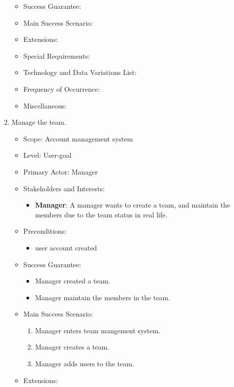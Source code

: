 \documentclass[12pt, a4paper]{article}
\begin{document}
\begin{CJK*}{UTF8}{bkai}
\begin{enumerate}
\begin{itemize}
          \item Success Guarantee:
          \item Main Success Scenario:
          \item Extensions:
          \item Special Requirements:
          \item Technology and Data Variations List:
          \item Frequency of Occurrence:
          \item Miscellaneous:
        \end{itemize}
      \item Manage the team.
        \begin{itemize}
          \item Scope: Account management system
          \item Level: User-goal
          \item Primary Actor: Manager
          \item Stakeholders and Interests:
            \begin{itemize}
              \item {\bf Manager}: A manager wants to create a team, and maintain the members due to the team status in real life.
            \end{itemize}
          \item Preconditions:
            \begin{itemize}
              \item user account created
            \end{itemize}
          \item Success Guarantee:
            \begin{itemize}
              \item Manager created a team.
              \item Manager maintain the members in the team.
            \end{itemize}
          \item Main Success Scenario:
            \begin{enumerate}
              \item Manager enters team mangement system.
              \item Manager creates a team.
              \item Manager adds users to the team.
            \end{enumerate}
          \item Extensions:

\end{itemize}
\end{enumerate}
\end{CJK*}
\end{document}
